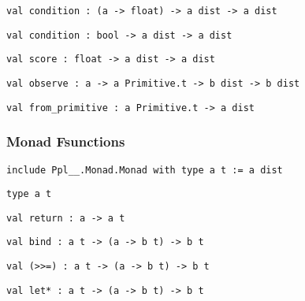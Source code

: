 \protect\hyperlink{val-conditionux27}{}\texttt{val\ condition\textquotesingle{}\ :\ (\textquotesingle{}a\ -\textgreater{}\ float)\ -\textgreater{}\ \textquotesingle{}a\ dist\ -\textgreater{}\ \textquotesingle{}a\ dist}

\protect\hyperlink{val-condition}{}\texttt{val\ condition\ :\ bool\ -\textgreater{}\ \textquotesingle{}a\ dist\ -\textgreater{}\ \textquotesingle{}a\ dist}

\protect\hyperlink{val-score}{}\texttt{val\ score\ :\ float\ -\textgreater{}\ \textquotesingle{}a\ dist\ -\textgreater{}\ \textquotesingle{}a\ dist}

\protect\hyperlink{val-observe}{}\texttt{val\ observe\ :\ \textquotesingle{}a\ -\textgreater{}\ \textquotesingle{}a\ Primitive.t\ -\textgreater{}\ \textquotesingle{}b\ dist\ -\textgreater{}\ \textquotesingle{}b\ dist}

\protect\hyperlink{val-fromux5fprimitive}{}\texttt{val\ from\_primitive\ :\ \textquotesingle{}a\ Primitive.t\ -\textgreater{}\ \textquotesingle{}a\ dist}

\hypertarget{distux5fmonad}{\subsubsection{\texorpdfstring{\protect\hyperlink{distux5fmonad}{}Monad
Fsunctions}{Monad Fsunctions}}\label{distux5fmonad}}

{\texttt{include\ Ppl\_\_.Monad.Monad\ with\ type\ \textquotesingle{}a\ t\ :=\ \textquotesingle{}a\ dist}}

\protect\hyperlink{type-t}{}\texttt{type\ \textquotesingle{}a\ t}

\protect\hyperlink{val-return}{}\texttt{val\ return\ :\ \textquotesingle{}a\ -\textgreater{}\ \textquotesingle{}a\ t}

\protect\hyperlink{val-bind}{}\texttt{val\ bind\ :\ \textquotesingle{}a\ t\ -\textgreater{}\ (\textquotesingle{}a\ -\textgreater{}\ \textquotesingle{}b\ t)\ -\textgreater{}\ \textquotesingle{}b\ t}

\protect\hyperlink{val-ux28ux5cux253Eux5cux253E=ux29}{}\texttt{val\ (\textgreater{}\textgreater{}=)\ :\ \textquotesingle{}a\ t\ -\textgreater{}\ (\textquotesingle{}a\ -\textgreater{}\ \textquotesingle{}b\ t)\ -\textgreater{}\ \textquotesingle{}b\ t}

\protect\hyperlink{val-letux2a}{}\texttt{val\ let*\ :\ \textquotesingle{}a\ t\ -\textgreater{}\ (\textquotesingle{}a\ -\textgreater{}\ \textquotesingle{}b\ t)\ -\textgreater{}\ \textquotesingle{}b\ t}


